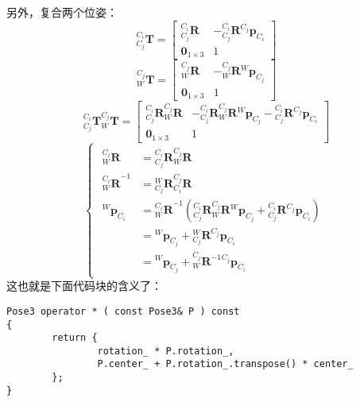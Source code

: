 \documentclass[12pt, twocolumn]{article}
\newcommand{\normf}{\kaishu}
\begin{document}
	\subsection{\normf{复合位姿}}
	另外，复合两个位姿：
	\begin{equation*}
		{^{C_i}_{C_j}\boldsymbol{T}}=\begin{bmatrix}
			{^{C_i}_{C_j}\boldsymbol{R}}&-{^{C_i}_{C_j}\boldsymbol{R}}{^{C_j}\boldsymbol{p}_{C_i}}\\
			\boldsymbol{0}_{1\times 3}&1
		\end{bmatrix}
	\end{equation*}
	\begin{equation*}
	{^{C_j}_{W}\boldsymbol{T}}=\begin{bmatrix}
		{^{C_j}_{W}\boldsymbol{R}}&-{^{C_j}_{W}\boldsymbol{R}}{^{W}\boldsymbol{p}_{C_j}}\\
		\boldsymbol{0}_{1\times 3}&1
	\end{bmatrix}
	\end{equation*}
	\begin{equation*}
	{^{C_i}_{C_j}\boldsymbol{T}}{^{C_j}_{W}\boldsymbol{T}}=\begin{bmatrix}
		{^{C_i}_{C_j}\boldsymbol{R}}{^{C_j}_{W}\boldsymbol{R}}&-{^{C_i}_{C_j}\boldsymbol{R}}{^{C_j}_{W}\boldsymbol{R}}{^{W}\boldsymbol{p}_{C_j}}-{^{C_i}_{C_j}\boldsymbol{R}}{^{C_j}\boldsymbol{p}_{C_i}}\\
		\boldsymbol{0}_{1\times 3}&1
	\end{bmatrix}
	\end{equation*}
	\begin{equation*}
	\begin{cases}
		\begin{aligned}
			{^{C_i}_{W}\boldsymbol{R}}&={^{C_i}_{C_j}\boldsymbol{R}}{^{C_j}_{W}\boldsymbol{R}}\\
			{^{C_i}_{W}\boldsymbol{R}}^{-1}&={^{W}_{C_j}\boldsymbol{R}}{^{C_j}_{C_i}\boldsymbol{R}}\\
			^{W}\boldsymbol{p}_{C_i}&={^{C_i}_{W}\boldsymbol{R}}^{-1}({^{C_i}_{C_j}\boldsymbol{R}}{^{C_j}_{W}\boldsymbol{R}}{^{W}\boldsymbol{p}_{C_j}}+{^{C_i}_{C_j}\boldsymbol{R}}{^{C_j}\boldsymbol{p}_{C_i}})\\
			&={^{W}\boldsymbol{p}_{C_j}}+{^{W}_{C_j}\boldsymbol{R}}{^{C_j}\boldsymbol{p}_{C_i}}\\
			&={^{W}\boldsymbol{p}_{C_j}}+{^{C_j}_{W}\boldsymbol{R}^{-1}}{^{C_j}\boldsymbol{p}_{C_i}}
		\end{aligned}
	\end{cases}
	\end{equation*}
	这也就是下面代码块的含义了：
		\begin{lstlisting}[label=code2,caption={\normf 位姿复合}]
Pose3 operator * ( const Pose3& P ) const
{
		return {
				rotation_ * P.rotation_,
				P.center_ + P.rotation_.transpose() * center_
		};
}
	\end{lstlisting}
	
\end{document}
